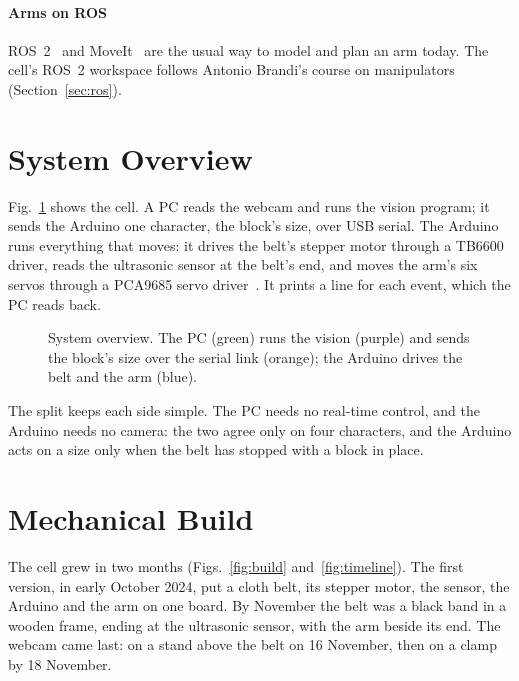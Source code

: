 \documentclass[11pt]{article}
\begin{document}
\paragraph{Arms on ROS} ROS~2~\cite{macenski2022ros2} and MoveIt~\cite{coleman2014moveit} are the usual way to model and plan an arm today. The cell's ROS~2 workspace follows Antonio Brandi's course on manipulators~\cite{brandi2023course} (Section~\ref{sec:ros}).

\section{System Overview}
\label{sec:overview}

Fig.~\ref{fig:overview} shows the cell. A PC reads the webcam and runs the vision program; it sends the Arduino one character, the block's size, over USB serial. The Arduino runs everything that moves: it drives the belt's stepper motor through a TB6600 driver, reads the ultrasonic sensor at the belt's end, and moves the arm's six servos through a PCA9685 servo driver~\cite{pca9685}. It prints a line for each event, which the PC reads back.

\begin{figure}[htbp]
  \centering
  \caption{System overview. The PC (green) runs the vision (purple) and sends the block's size over the serial link (orange); the Arduino drives the belt and the arm (blue).}
  \label{fig:overview}
\end{figure}

The split keeps each side simple. The PC needs no real-time control, and the Arduino needs no camera: the two agree only on four characters, and the Arduino acts on a size only when the belt has stopped with a block in place.

\section{Mechanical Build}
\label{sec:build}

The cell grew in two months (Figs.~\ref{fig:build} and~\ref{fig:timeline}). The first version, in early October 2024, put a cloth belt, its stepper motor, the sensor, the Arduino and the arm on one board. By November the belt was a black band in a wooden frame, ending at the ultrasonic sensor, with the arm beside its end. The webcam came last: on a stand above the belt on 16 November, then on a clamp by 18 November.
\end{document}
